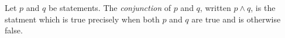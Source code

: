 \guard





\begin{defn}
\label{defn:conjunctionOfStatement}
  Let $p$ and $q$ be statements.
  The \emph{conjunction} of $p$ and $q$, written $p \wedge q$, is the statment which is true precisely when both $p$ and $q$ are true and is otherwise false.
\end{defn}

